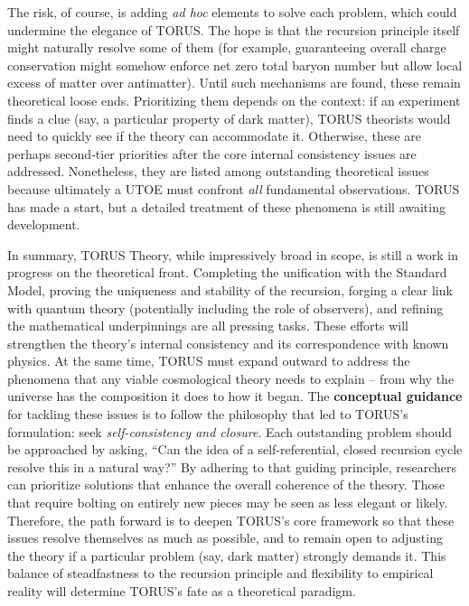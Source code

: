 \documentclass[
]{article}
\begin{document}
\begin{itemize}
  The risk, of course, is adding \emph{ad hoc} elements to solve each
  problem, which could undermine the elegance of TORUS. The hope is that
  the recursion principle itself might naturally resolve some of them
  (for example, guaranteeing overall charge conservation might somehow
  enforce net zero total baryon number but allow local excess of matter
  over antimatter). Until such mechanisms are found, these remain
  theoretical loose ends. Prioritizing them depends on the context: if
  an experiment finds a clue (say, a particular property of dark
  matter), TORUS theorists would need to quickly see if the theory can
  accommodate it. Otherwise, these are perhaps second-tier priorities
  after the core internal consistency issues are addressed. Nonetheless,
  they are listed among outstanding theoretical issues because
  ultimately a UTOE must confront \emph{all} fundamental observations.
  TORUS has made a start, but a detailed treatment of these phenomena is
  still awaiting development.
\end{itemize}

In summary, TORUS Theory, while impressively broad in scope, is still a
work in progress on the theoretical front. Completing the unification
with the Standard Model, proving the uniqueness and stability of the
recursion, forging a clear link with quantum theory (potentially
including the role of observers), and refining the mathematical
underpinnings are all pressing tasks. These efforts will strengthen the
theory's internal consistency and its correspondence with known physics.
At the same time, TORUS must expand outward to address the phenomena
that any viable cosmological theory needs to explain -- from why the
universe has the composition it does to how it began. The
\textbf{conceptual guidance} for tackling these issues is to follow the
philosophy that led to TORUS's formulation: seek \emph{self-consistency
and closure}. Each outstanding problem should be approached by asking,
``Can the idea of a self-referential, closed recursion cycle resolve
this in a natural way?'' By adhering to that guiding principle,
researchers can prioritize solutions that enhance the overall coherence
of the theory. Those that require bolting on entirely new pieces may be
seen as less elegant or likely. Therefore, the path forward is to deepen
TORUS's core framework so that these issues resolve themselves as much
as possible, and to remain open to adjusting the theory if a particular
problem (say, dark matter) strongly demands it. This balance of
steadfastness to the recursion principle and flexibility to empirical
reality will determine TORUS's fate as a theoretical paradigm.
\end{document}

